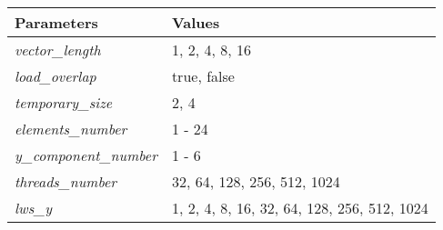 \begin{table}[]
\footnotesize
\begin{tabular}{@{}m{}m{}@{}}
\toprule
Parameters & Values \\ \midrule
\textit{vector\_length} & 1, 2, 4, 8, 16 \\
\textit{load\_overlap} & true, false \\
\textit{temporary\_size} & 2, 4 \\
\textit{elements\_number} & 1 - 24 \\
\textit{y\_component\_number} & 1 - 6 \\
\textit{threads\_number} & 32, 64, 128, 256, 512, 1024 \\
\textit{lws\_y} & 1, 2, 4, 8, 16, 32, 64, 128, 256, 512, 1024 \\ \bottomrule
\end{tabular}
\end{table}
